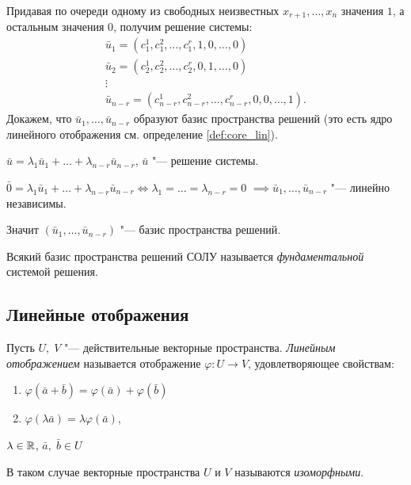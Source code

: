 Придавая по очереди одному из свободных неизвестных $x_{r + 1}, \ldots, x_n$ значения $1$, а остальным значения $0$, получим решение системы:
$$
\begin{array}{l}
    \bar{u}_1 = (c_1^1,c_1^2,\ldots,c_1^r,1,0,\ldots,0) \\
    \bar{u}_2 = (c_2^1,c_2^2,\ldots,c_2^r,0,1,\ldots,0) \\
    \vdots \\
    \bar{u}_{n - r} = (c_{n - r}^1, c_{n - r}^2, \ldots, c_{n - r}^r, 0, 0, \ldots, 1).
\end{array}
$$
Докажем, что $\bar{u}_1, \ldots, \bar{u}_{n - r}$ образуют базис пространства решений (это есть ядро линейного отображения см. определение \ref{def:core_lin}).
\begin{Proof}
    $\bar{u} = \lambda_1\bar{u}_1 + \ldots + \lambda_{n - r}\bar{u}_{n - r}$, $\bar{u}$ "--- решение системы.

    $\bar{0} = \lambda_1\bar{u}_1 + \ldots + \lambda_{n - r}\bar{u}_{n - r} \Leftrightarrow \lambda_1 = \ldots = \lambda_{n - r} = 0$
    $\implies \bar{u}_1, \ldots, \bar{u}_{n - r}$ "--- линейно независимы.
    
    Значит $(\bar{u}_1, \ldots, \bar{u}_{n - r})$ "--- базис пространства решений. 
\end{Proof}

\begin{definition}
    Всякий базис пространства решений СОЛУ называется \textit{фундаментальной} системой решения.
\end{definition}

\subsection*{Линейные отображения}
\begin{definition}
    Пусть $U,\;V$ "--- действительные векторные пространства.
    \textit{Линейным отображением} называется отображение $\varphi: U \to V$, удовлетворяющее свойствам:
    \begin{enumerate}
        \item $\varphi(\bar{a} + \bar{b}) = \varphi(\bar{a}) + \varphi(\bar{b})$
        \item $\varphi(\lambda\bar{a}) = \lambda\varphi(\bar{a})$,
    \end{enumerate}
    $\lambda \in \mathbb{R}$, $\bar{a},\;\bar{b} \in U$
    
\end{definition}
В таком случае векторные пространства $U$ и $V$ называются \textit{изоморфными}. 

